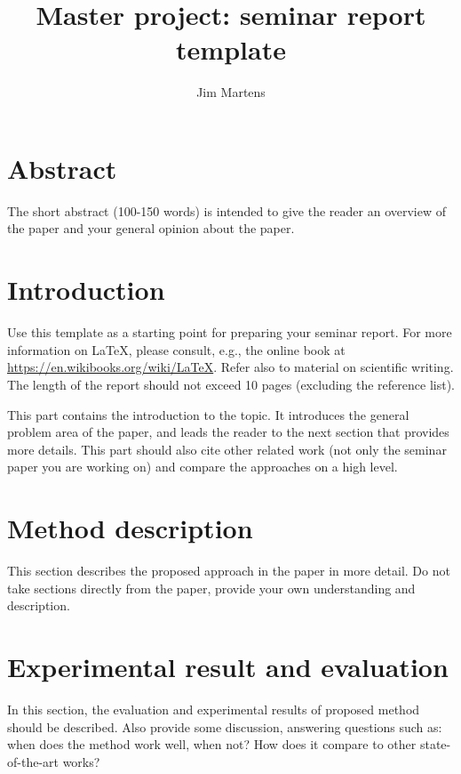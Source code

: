 \documentclass[12pt]{scrartcl}
\begin{document}
\title{Master project: seminar report template}
\author{Jim Martens}

\maketitle
\section*{Abstract}

The short abstract (100-150 words) is intended to give the reader an overview of the paper and your general opinion about the paper.


\setcounter{tocdepth}{2} 					%
\tableofcontents
{}
\clearpage

\section{Introduction}
Use this template as a starting point for preparing your seminar report.
For more information on \LaTeX, please consult, e.g., the online book at \url{https://en.wikibooks.org/wiki/LaTeX}.
Refer also to material on scientific writing.
The length of the report should not exceed 10 pages (excluding the reference list).

This part contains the introduction to the topic.
It introduces the general problem area of the paper, and leads the reader to the next section that provides more details.
This part should also cite other related work (not only the seminar paper you are working on) and compare the approaches on a high level.

\section{Method description}
This section describes the proposed approach in the paper in more detail.
Do not take sections directly from the paper, provide your own understanding and description.


\section{Experimental result and evaluation}
In this section, the evaluation and experimental results of proposed method should be described.
Also provide some discussion, answering questions such as: when does the method work well, when not? How does it compare to other state-of-the-art works?
\end{document}
